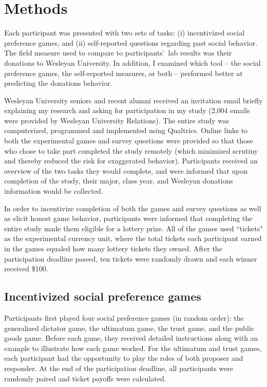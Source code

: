 \documentclass[12pt]{article}
\begin{document}
\section{Methods}

Each participant was presented with two sets of tasks: (i) incentivized social preference games, and (ii) self-reported questions regarding past social behavior. The field measure used to compare to participants\rq \ lab results was their donations to Wesleyan University.  In addition, I examined which tool -- the social preference games, the self-reported measures, or both -- performed better at predicting the donations behavior.
 
Wesleyan University seniors and recent alumni received an invitation email briefly explaining my research and asking for participation in my study (2,004 emails were provided by Wesleyan University Relations). The entire study was computerized, programmed and implemented using Qualtrics. Online links to both the experimental games and survey questions were provided so that those who chose to take part completed the study remotely (which minimized scrutiny and thereby reduced the risk for exaggerated behavior). Participants received an overview of the two tasks they would complete, and were informed that upon completion of the study, their major, class year, and Wesleyan donations information would be collected.

In order to incentivize completion of both the games and survey questions as well as elicit honest game behavior, participants were informed that completing the entire study made them eligible for a lottery prize. All of the games used ``tickets" as the experimental currency unit, where the total tickets each participant earned in the games equaled how many lottery tickets they owned. After the participation deadline passed, ten tickets were randomly drawn and each winner received \$100.


\subsection{Incentivized social preference games}


Participants first played four social preference games (in random order): the generalized dictator game, the ultimatum game, the trust game, and the public goods game. Before each game, they received detailed instructions along with an example to illustrate how each game worked. For the ultimatum and trust games, each participant had the opportunity to play the roles of both proposer and responder. At the end of the participation deadline, all participants were randomly paired and ticket payoffs were calculated.
\end{document}
